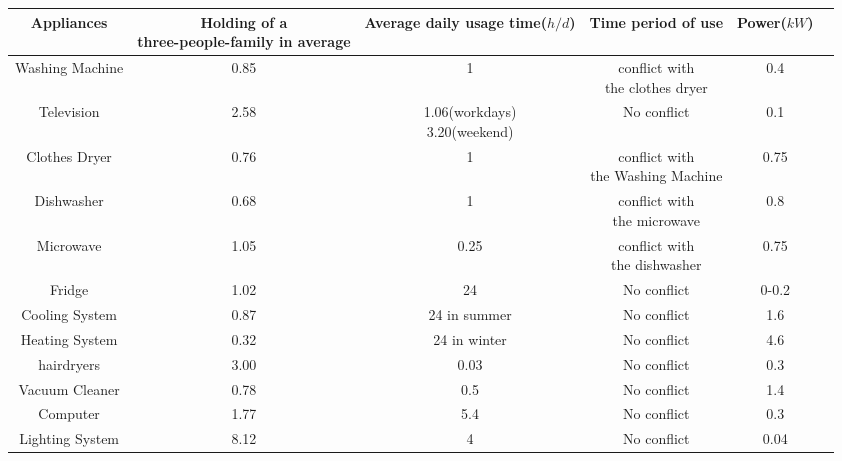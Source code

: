 \documentclass[UTF-8]{article}
\begin{document}
    \normalsize
    \begin{center}
        \begin{tabular}{|c | c |c | c |c  |c|}
            \hline
            \bf Appliances& \makecell {\bf Holding of a \\ \bf three-people-family in average} & \makecell{\bf Average daily\\ \bf usage time($h/d$)}  & \bf Time period of use 
            & \bf Power($kW$) \\ \hline
            Washing Machine & 0.85 & 1 & \makecell{conflict with \\the clothes dryer} & 0.4 \\ \hline
            Television & 2.58 & \makecell{1.06(workdays)\\3.20(weekend)} & No conflict & 0.1 \\ \hline
            Clothes Dryer & 0.76 & 1 & \makecell{conflict with \\the Washing Machine}& 0.75 \\ \hline
            Dishwasher & 0.68 & 1 & \makecell{conflict with \\ the microwave}& 0.8\\ \hline
            Microwave & 1.05 & 0.25 & \makecell{conflict with \\ the dishwasher } & 0.75 \\\hline
            Fridge & 1.02 & 24 & No conflict & 0-0.2 \\ \hline 
            Cooling System & 0.87 & 24 in summer & No conflict & 1.6 \\ \hline 
            Heating System & 0.32 & 24 in winter & No conflict &4.6 \\ \hline
         hairdryers & 3.00 & 0.03 & No conflict & 0.3 \\ \hline 
            Vacuum Cleaner & 0.78 & 0.5 & No conflict & 1.4 \\ \hline
            Computer & 1.77 &5.4 & No conflict & 0.3 \\\hline 
            Lighting System & 8.12 & 4 & No conflict & 0.04 \\ \hline
        \end{tabular}
    \end{center}
    
\end{document}
